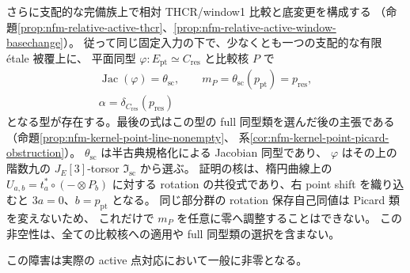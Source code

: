 さらに支配的な完備族上で相対 THCR/window1 比較と底変更を構成する
（命題\ref{prop:nfm-relative-active-thcr}、\ref{prop:nfm-relative-active-window-basechange}）。
従って同じ固定入力の下で、少なくとも一つの支配的な有限 étale 被覆上に、
平面同型 $\varphi:E_{\mathrm{pt}}\simeq C_{\mathrm{res}}$ と比較核 $P$ で
\[
 \begin{gathered}
 \operatorname{Jac}(\varphi)=\theta_{\mathrm{sc}},\qquad
 m_P=\theta_{\mathrm{sc}}(p_{\mathrm{pt}})=p_{\mathrm{res}},\\
 \alpha=\delta_{C_{\mathrm{res}}}(p_{\mathrm{res}})
 \end{gathered}
\]
となる型が存在する。最後の式はこの型の full 同型類を選んだ後の主張である
（命題\ref{prop:nfm-kernel-point-line-nonempty}、
系\ref{cor:nfm-kernel-point-picard-obstruction}）。
$\theta_{\mathrm{sc}}$ は半古典規格化による Jacobian 同型であり、
$\varphi$ はその上の階数九の $J_E[3]$-torsor $\mathfrak I_{\mathrm{sc}}$ から選ぶ。
証明の核は、楕円曲線上の $U_{a,b}=t_a^*\circ(-\otimes P_b)$ に対する
rotation の共役式であり、右 point shift を織り込むと $3a=0$、$b=p_{\mathrm{pt}}$ となる。
同じ部分群の rotation 保存自己同値は Picard 類を変えないため、
これだけで $m_P$ を任意に零へ調整することはできない。
この非空性は、全ての比較核への適用や full 同型類の選択を含まない。

この障害は実際の active 点対応において一般に非零となる。


